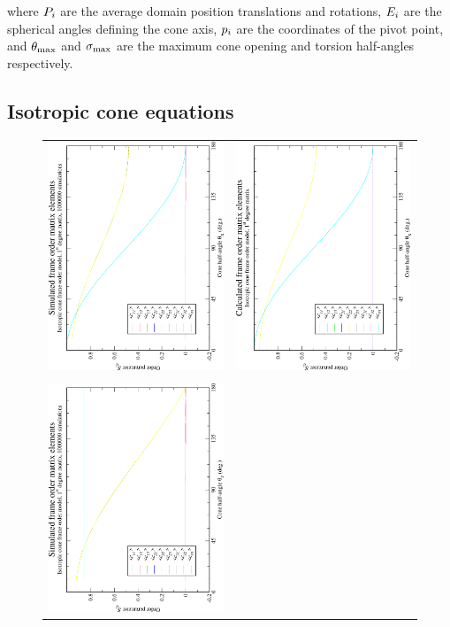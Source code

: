 where $P_i$ are the average domain position translations and rotations, $E_i$ are the spherical angles defining the cone axis, $p_i$ are the coordinates of the pivot point, and $\theta_\textrm{max}$ and $\sigma_\textrm{max}$ are the maximum cone opening and torsion half-angles respectively.




\subsection{Isotropic cone equations}

\begin{figure}
\centering
  \begin{tabular}{@{}cc@{}}
    \includegraphics[width=.35\textwidth,angle=270]{images/frame_order_matrix/Sij_iso_cone_in_frame_theta_x_ens1000000.eps} &
    \includegraphics[width=.35\textwidth,angle=270]{images/frame_order_matrix/Sij_iso_cone_in_frame_theta_x_calc.eps} \\
    \\[-5pt]
    \includegraphics[width=.35\textwidth,angle=270]{images/frame_order_matrix/Sij_iso_cone_in_frame_theta_z_ens1000000.eps} &

\end{tabular}
\end{figure}
